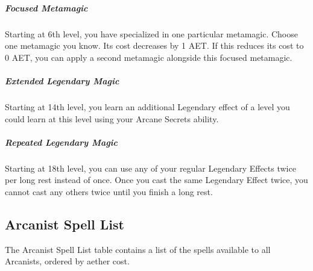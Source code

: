 \subparagraph*{Focused Metamagic}
Starting at 6th level, you have specialized in one particular metamagic. Choose one metamagic you know. Its cost decreases by 1 AET. If this reduces its cost to 0 AET, you can apply a second metamagic alongside this focused metamagic.

\subparagraph*{Extended Legendary Magic}
Starting at 14th level, you learn an additional Legendary effect of a level you could learn at this level using your Arcane Secrets ability.

\subparagraph*{Repeated Legendary Magic}
Starting at 18th level, you can use any of your regular Legendary Effects twice per long rest instead of once. Once you cast the same Legendary Effect twice, you cannot cast any others twice until you finish a long rest.

\subsection{Arcanist Spell List}
The Arcanist Spell List table contains a list of the spells available to all Arcanists, ordered by aether cost.

